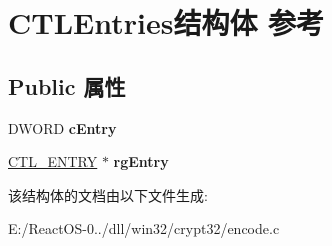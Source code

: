 \hypertarget{struct_c_t_l_entries}{}\section{C\+T\+L\+Entries结构体 参考}
\label{struct_c_t_l_entries}
\subsection*{Public 属性}
\begin{DoxyCompactItemize}
\item 
\mbox{\label{struct_c_t_l_entries_a33f37e894cb9e07286f2598eac22ffc0}} 
D\+W\+O\+RD {\bfseries c\+Entry}
\item 
\mbox{\label{struct_c_t_l_entries_a876a804474a3158acc52848e40918541}} 
\hyperlink{struct___c_t_l___e_n_t_r_y}{C\+T\+L\+\_\+\+E\+N\+T\+RY} $\ast$ {\bfseries rg\+Entry}
\end{DoxyCompactItemize}


该结构体的文档由以下文件生成\+:\begin{DoxyCompactItemize}
\item 
E\+:/\+React\+O\+S-\/0../dll/win32/crypt32/encode.\+c\end{DoxyCompactItemize}
